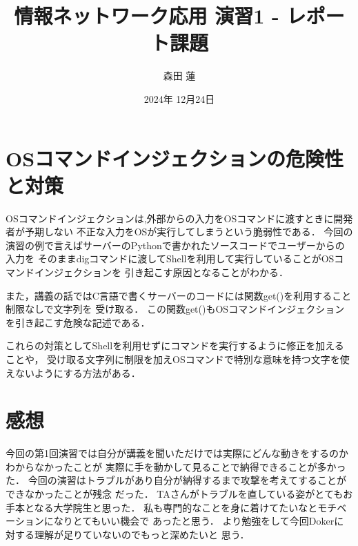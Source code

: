 \documentclass{jlreq}
\title{情報ネットワーク応用 演習1 - レポート課題}
\author{森田 蓮}
\date{2024年 12月24日}
\begin{document}
\maketitle

\section{OSコマンドインジェクションの危険性と対策}
OSコマンドインジェクションは,外部からの入力をOSコマンドに渡すときに開発者が予期しない
不正な入力をOSが実行してしまうという脆弱性である．
今回の演習の例で言えばサーバーのPythonで書かれたソースコードでユーザーからの入力を
そのままdigコマンドに渡してShellを利用して実行していることがOSコマンドインジェクションを
引き起こす原因となることがわかる．

また，講義の話ではC言語で書くサーバーのコードには関数get()を利用すること制限なしで文字列を
受け取る．
この関数get()もOSコマンドインジェクションを引き起こす危険な記述である．

これらの対策としてShellを利用せずにコマンドを実行するように修正を加えることや，
受け取る文字列に制限を加えOSコマンドで特別な意味を持つ文字を使えないようにする方法がある．


\section{感想}
今回の第1回演習では自分が講義を聞いただけでは実際にどんな動きをするのかわからなかったことが
実際に手を動かして見ることで納得できることが多かった．
今回の演習はトラブルがあり自分が納得するまで攻撃を考えてすることができなかったことが残念
だった．
TAさんがトラブルを直している姿がとてもお手本となる大学院生と思った．
私も専門的なことを身に着けてたいなとモチベーションになりとてもいい機会で
あったと思う．
より勉強をして今回Dokerに対する理解が足りていないのでもっと深めたいと
思う．
\end{document}
